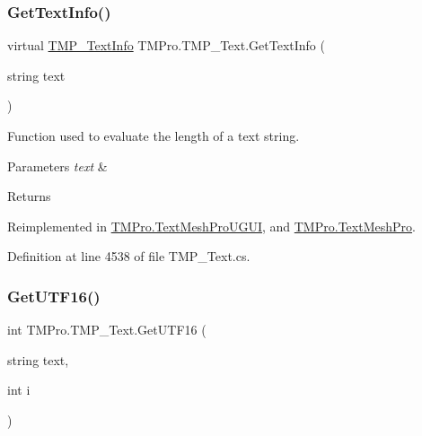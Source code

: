 \subsubsection{\texorpdfstring{GetTextInfo()}{GetTextInfo()}}
{\footnotesize\ttfamily virtual \mbox{\hyperlink{class_t_m_pro_1_1_t_m_p___text_info}{T\+M\+P\+\_\+\+Text\+Info}} T\+M\+Pro.\+T\+M\+P\+\_\+\+Text.\+Get\+Text\+Info (\begin{DoxyParamCaption}\item[{string}]{text }\end{DoxyParamCaption})\hspace{0.3cm}{\ttfamily [virtual]}}



Function used to evaluate the length of a text string. 


\begin{DoxyParams}{Parameters}
{\em text} & \\
\hline
\end{DoxyParams}
\begin{DoxyReturn}{Returns}

\end{DoxyReturn}


Reimplemented in \mbox{\hyperlink{class_t_m_pro_1_1_text_mesh_pro_u_g_u_i_a8232388d078ad69a9ea241fa15bd2fab}{T\+M\+Pro.\+Text\+Mesh\+Pro\+U\+G\+UI}}, and \mbox{\hyperlink{class_t_m_pro_1_1_text_mesh_pro_a3652c1b48e8b425fc8a599aa05fad59e}{T\+M\+Pro.\+Text\+Mesh\+Pro}}.



Definition at line 4538 of file T\+M\+P\+\_\+\+Text.\+cs.

\mbox{\label{class_t_m_pro_1_1_t_m_p___text_ac300ce0327de1c0807c6617496b367cb}} 
\subsubsection{\texorpdfstring{GetUTF16()}{GetUTF16()}\hspace{0.1cm}{\footnotesize\ttfamily [1/2]}}
{\footnotesize\ttfamily int T\+M\+Pro.\+T\+M\+P\+\_\+\+Text.\+Get\+U\+T\+F16 (\begin{DoxyParamCaption}\item[{string}]{text,  }\item[{int}]{i }\end{DoxyParamCaption})\hspace{0.3cm}{\ttfamily [protected]}}



